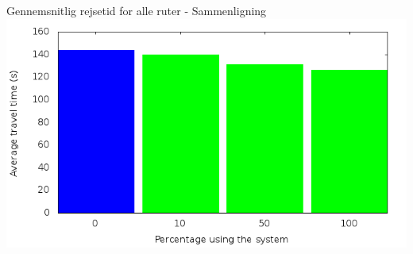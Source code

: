 \begin{frame}{Gennemsnitlig rejsetid for alle ruter - Sammenligning}
\includegraphics[width=1\textwidth]{../images/tp0/combinedTime.png}
\end{frame}




